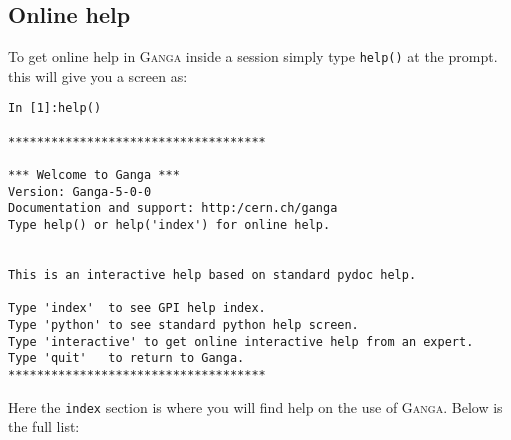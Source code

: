 \documentclass{howto}
\def\ganga {\textsc{Ganga}\xspace}
\begin{document}
\subsection{Online help}
\label{sec:OnlineHelp}
To get online help in \ganga inside a session simply type \texttt{help()} at
the prompt. this will give you a screen as:
\begin{verbatim}
In [1]:help()

************************************

*** Welcome to Ganga ***
Version: Ganga-5-0-0
Documentation and support: http:/cern.ch/ganga
Type help() or help('index') for online help.


This is an interactive help based on standard pydoc help.

Type 'index'  to see GPI help index.
Type 'python' to see standard python help screen.
Type 'interactive' to get online interactive help from an expert.
Type 'quit'   to return to Ganga.
************************************
\end{verbatim}
Here the \texttt{index} section is where you will find help on the use of
\ganga. Below is the full list:
\end{document}
